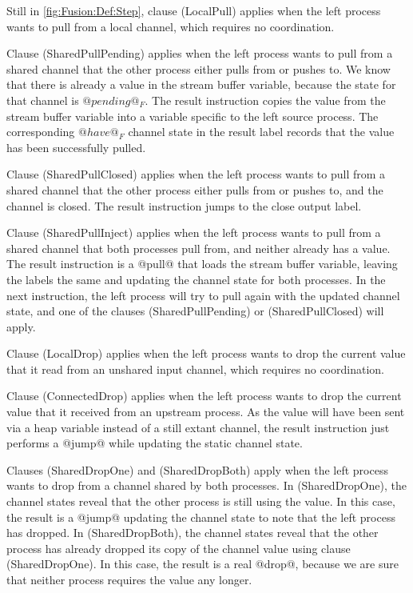 Still in \cref{fig:Fusion:Def:Step}, clause (LocalPull) applies when the left process wants to pull from a local channel, which requires no coordination.

Clause (SharedPullPending) applies when the left process wants to pull from a shared channel that the other process either pulls from or pushes to.
We know that there is already a value in the stream buffer variable, because the state for that channel is $@pending@_F$.
The result instruction copies the value from the stream buffer variable into a variable specific to the left source process.
The corresponding $@have@_F$ channel state in the result label records that the value has been successfully pulled.

Clause (SharedPullClosed) applies when the left process wants to pull from a shared channel that the other process either pulls from or pushes to, and the channel is closed.
The result instruction jumps to the close output label.

Clause (SharedPullInject) applies when the left process wants to pull from a shared channel that both processes pull from, and neither already has a value.
The result instruction is a @pull@ that loads the stream buffer variable, leaving the labels the same and updating the channel state for both processes.
In the next instruction, the left process will try to pull again with the updated channel state, and one of the clauses (SharedPullPending) or (SharedPullClosed) will apply.

Clause (LocalDrop) applies when the left process wants to drop the current value that it read from an unshared input channel, which requires no coordination.

Clause (ConnectedDrop) applies when the left process wants to drop the current value that it received from an upstream process. As the value will have been sent via a heap variable instead of a still extant channel, the result instruction just performs a @jump@ while updating the static channel state.

Clauses (SharedDropOne) and (SharedDropBoth) apply when the left process wants to drop from a channel shared by both processes. In (SharedDropOne), the channel states reveal that the other process is still using the value. In this case, the result is a @jump@ updating the channel state to note that the left process has dropped. In (SharedDropBoth), the channel states reveal that the other process has already dropped its copy of the channel value using clause (SharedDropOne). In this case, the result is a real @drop@, because we are sure that neither process requires the value any longer.

